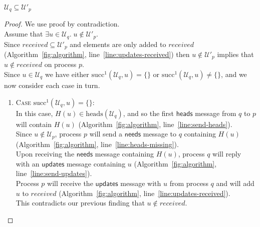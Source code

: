 \documentclass[a4paper,anonymous,USenglish]{lipics-v2019}
\begin{document}
\begin{lemma}\label{lemma:no-q-missing}
$\mathcal{U}_q \subseteq \mathcal{U}'_p$
\end{lemma}
\begin{proof}
We use proof by contradiction.\\
Assume that $\exists u \in \mathcal{U}_q.\; u \notin  \mathcal{U}'_p$.\\
Since $\mathit{received} \subseteq \mathcal{U}'_p$ and elements are only added to $\mathit{received}$ (Algorithm~\ref{fig:algorithm}, line~\ref{line:updates-received}) then $u \notin  \mathcal{U}'_p$ implies that $u \notin \mathit{received}$ on process $p$.\\
Since $u \in \mathcal{U}_q$ we have either $\mathrm{succ}^1(\mathcal{U}_q, u) = \{\}$ or $\mathrm{succ}^1(\mathcal{U}_q, u) \ne \{\}$, and we now consider each case in turn.
\begin{enumerate}
    \item\textsc{Case} $\mathrm{succ}^1(\mathcal{U}_q, u) = \{\}$:\\
    In this case, $H(u) \in \mathrm{heads}(\mathcal{U}_q)$, and so the first $\mathsf{heads}$ message from $q$ to $p$ will contain $H(u)$ (Algorithm~\ref{fig:algorithm}, line~\ref{line:send-heads}).\\
    Since $u \notin \mathcal{U}_p$, process $p$ will send a $\mathsf{needs}$ message to $q$ containing $H(u)$ (Algorithm~\ref{fig:algorithm}, line~\ref{line:heads-missing}).\\
    Upon receiving the $\mathsf{needs}$ message containing $H(u)$, process $q$ will reply with an $\mathsf{updates}$ message containing $u$ (Algorithm~\ref{fig:algorithm}, line~\ref{line:send-updates}).\\
    Process $p$ will receive the $\mathsf{updates}$ message with $u$ from process $q$ and will add $u$ to $\mathit{received}$ (Algorithm~\ref{fig:algorithm}, line~\ref{line:updates-received}).\\
    This contradicts our previous finding that $u \notin \mathit{received}$.
    

\end{enumerate}
\end{proof}
\end{document}
